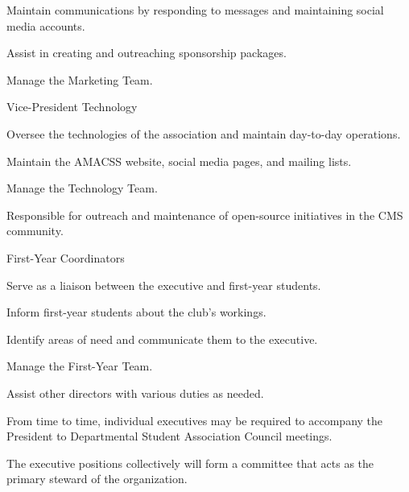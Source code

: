 \documentclass[12pt,a4paper]{article}
\begin{document}
\begin{constitutionlist}
\begin{constitutionlist}
\begin{constitutionlist}
\item Maintain communications by responding to messages and maintaining social media accounts.

\item Assist in creating and outreaching sponsorship packages.

\item Manage the Marketing Team.
\end{constitutionlist}

\item Vice-President Technology

\begin{constitutionlist}
\item Oversee the technologies of the association and maintain day-to-day operations.

\item Maintain the AMACSS website, social media pages, and mailing lists.

\item Manage the Technology Team.

\item Responsible for outreach and maintenance of open-source initiatives in the CMS community.
\end{constitutionlist}

\item First-Year Coordinators

\begin{constitutionlist}
\item Serve as a liaison between the executive and first-year students.

\item Inform first-year students about the club's workings.

\item Identify areas of need and communicate them to the executive.

\item Manage the First-Year Team.

\item Assist other directors with various duties as needed.
\end{constitutionlist}
\end{constitutionlist}

\item From time to time, individual executives may be required to accompany the President to Departmental Student Association Council meetings.

\item The executive positions collectively will form a committee that acts as the primary steward of the organization.


\end{constitutionlist}
\end{document}
